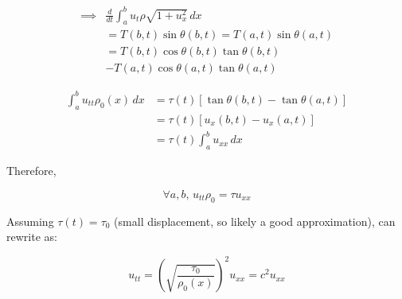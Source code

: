 \documentclass[main.tex]{subfiles}
\begin{document}
\begin{align}
\implies &\frac{d}{dt}\int_a^b u_t\rho\sqrt{1+u_x^2}\,dx \\
         &= T(b, t)\sin{\theta}(b, t) = T(a, t)\sin{\theta(a, t)} \\
         &= T(b, t)\cos{\theta(b, t)}\tan{\theta(b, t)} \\
         &- T(a, t)\cos{\theta(a, t)}\tan{\theta(a, t)}
\end{align}

\begin{align}
\int_a^b u_{tt}\rho_0(x)\,dx &= \tau(t)\left[\tan{\theta(b, t)} - \tan{\theta(a, t)}\right] \\
                             &= \tau(t)\left[u_x(b, t) - u_x(a, t)\right] \\
                             &= \tau(t)\int_a^b u_{xx}\,dx
\end{align}

Therefore,

$$\forall a, b\textrm{, }u_{tt}\rho_0 = \tau u_{xx}$$

Assuming $\tau(t) = \tau_0$ (small displacement, so likely a good approximation), can rewrite as:

$$u_{tt} = {\left(\sqrt{\frac{\tau_0}{\rho_0(x)}}\right)}^2 u_{xx} = c^2 u_{xx}$$
\end{document}

